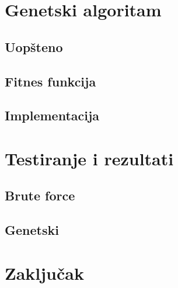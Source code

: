 \documentclass{article}
\begin{document}
    \section{Genetski algoritam}

    \subsection{Uopšteno}

    \subsection{Fitnes funkcija}

    \subsection{Implementacija}


    \section{Testiranje i rezultati}

    \subsection{Brute force}

    \subsection{Genetski}


    \section{Zaključak}

    \printbibliography[heading=bibintoc,title={Literatura}]
\end{document}
